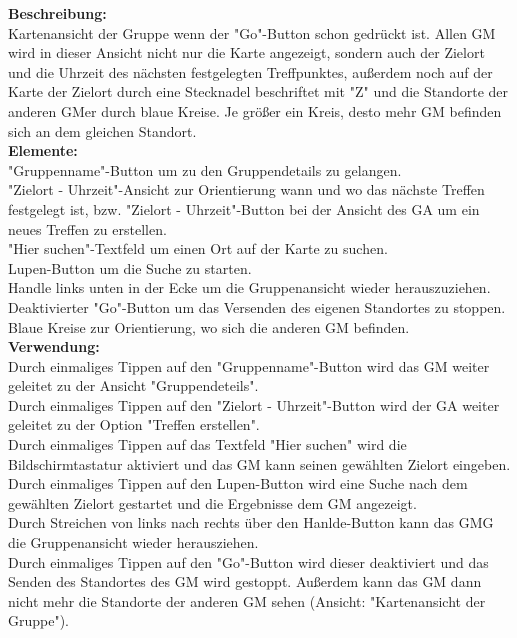 \textbf{Beschreibung:}\\
Kartenansicht der Gruppe wenn der "Go"-Button schon gedrückt ist. Allen GM wird in dieser Ansicht nicht nur die Karte angezeigt, sondern auch der Zielort und die Uhrzeit des nächsten festgelegten Treffpunktes, außerdem noch auf der Karte der Zielort durch eine Stecknadel beschriftet mit "Z" und die Standorte der anderen GMer durch blaue Kreise. Je größer ein Kreis, desto mehr GM befinden sich an dem gleichen Standort.\\
\textbf{Elemente:}\\
"Gruppenname"-Button um zu den Gruppendetails zu gelangen.\\
"Zielort - Uhrzeit"-Ansicht zur Orientierung wann und wo das nächste Treffen festgelegt ist, bzw. "Zielort - Uhrzeit"-Button bei der Ansicht des GA um ein neues Treffen zu erstellen.\\
"Hier suchen"-Textfeld um einen Ort auf der Karte zu suchen.\\
Lupen-Button um die Suche zu starten.\\
Handle links unten in der Ecke um die Gruppenansicht wieder herauszuziehen.\\
Deaktivierter "Go"-Button um das Versenden des eigenen Standortes zu stoppen.\\
Blaue Kreise zur Orientierung, wo sich die anderen GM befinden.\\
\textbf{Verwendung:}\\
Durch einmaliges Tippen auf den "Gruppenname"-Button wird das GM weiter geleitet zu der Ansicht "Gruppendeteils".\\
Durch einmaliges Tippen auf den "Zielort - Uhrzeit"-Button wird der GA weiter geleitet zu der Option "Treffen erstellen".\\
Durch einmaliges Tippen auf das Textfeld "Hier suchen" wird die Bildschirmtastatur aktiviert und das GM kann seinen gewählten Zielort eingeben.\\
Durch einmaliges Tippen auf den Lupen-Button wird eine Suche nach dem gewählten Zielort gestartet und die Ergebnisse dem GM angezeigt.\\
Durch Streichen von links nach rechts über den Hanlde-Button kann das GMG die Gruppenansicht wieder herausziehen.\\
Durch einmaliges Tippen auf den "Go"-Button wird dieser deaktiviert und das Senden des Standortes des GM wird gestoppt. Außerdem kann das GM dann nicht mehr die Standorte der anderen GM sehen (Ansicht: "Kartenansicht der Gruppe").
\clearpage
\newpage


